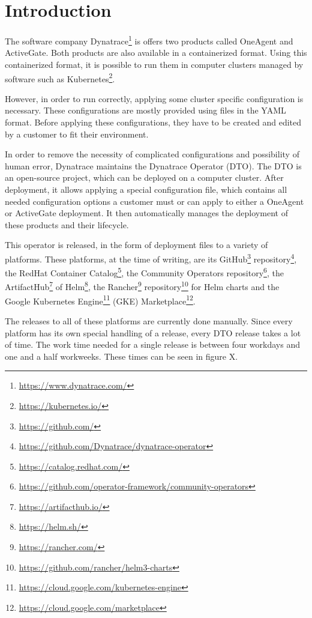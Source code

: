 
\chapter{Introduction}
\label{ch:introduction}

The software company Dynatrace\footnote{\url{https://www.dynatrace.com/}} is offers two products called OneAgent and ActiveGate.
Both products are also available in a containerized format.
Using this containerized format, it is possible to run them in computer clusters managed by software such as Kubernetes\footnote{\url{https://kubernetes.io/}}.

However, in order to run correctly, applying some cluster specific configuration is necessary.
These configurations are mostly provided using files in the YAML format\cite{UnderstandingKubernetesObjects}.
Before applying these configurations, they have to be created and edited by a customer to fit their environment.

In order to remove the necessity of complicated configurations and possibility of human error, Dynatrace maintains the Dynatrace Operator (DTO).
The DTO is an open-source project, which can be deployed on a computer cluster.
After deployment, it allows applying a special configuration file, which contains all needed configuration options a customer must or can apply to either a OneAgent or ActiveGate deployment.
It then automatically manages the deployment of these products and their lifecycle.

This operator\cite{OperatorPattern} is released, in the form of deployment files to a variety of platforms.
These platforms, at the time of writing, are
its GitHub\footnote{\url{https://github.com/}} repository\footnote{\url{https://github.com/Dynatrace/dynatrace-operator}},
the RedHat Container Catalog\footnote{\url{https://catalog.redhat.com/}},
the Community Operators repository\footnote{\url{https://github.com/operator-framework/community-operators}},
the ArtifactHub\footnote{\url{https://artifacthub.io/}} of Helm\footnote{\url{https://helm.sh/}},
the Rancher\footnote{\url{https://rancher.com/}} repository\footnote{\url{https://github.com/rancher/helm3-charts}} for Helm charts and
the Google Kubernetes Engine\footnote{\url{https://cloud.google.com/kubernetes-engine}} (GKE) Marketplace\footnote{\url{https://cloud.google.com/marketplace}}.

The releases to all of these platforms are currently done manually.
Since every platform has its own special handling of a release, every DTO release takes a lot of time.
The work time needed for a single release is between four workdays and one and a half workweeks.
These times can be seen in figure X.


